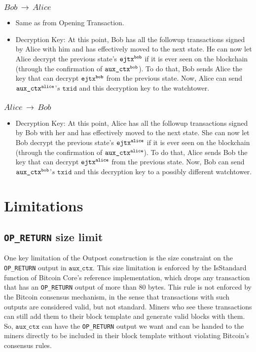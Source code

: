 \subsubsection{$Bob\,\to\,Alice$}
\begin{itemize}[leftmargin=4\parindent]
    \item Same as from Opening Transaction.
    \item Decryption Key: At this point, Bob has all the followup transactions signed by Alice with him and has effectively moved to the next state. He can now let Alice decrypt the previous state's $\texttt{ejtx\textsuperscript{bob}}$ if it is ever seen on the blockchain (through the confirmation of $\texttt{aux\_ctx\textsuperscript{bob}}$). To do that, Bob sends Alice the key that can decrypt $\texttt{ejtx\textsuperscript{bob}}$ from the previous state. Now, Alice can send $\texttt{aux\_ctx\textsuperscript{alice}}$'$s$ $\texttt{txid}$ and this decryption key to the watchtower.
\end{itemize}
\subsubsection{$Alice\,\to\,Bob$}        
\begin{itemize}[leftmargin=4\parindent]
    \item Decryption Key: At this point, Alice has all the followup transactions signed by Bob with her and has effectively moved to the next state. She can now let Bob decrypt the previous state's $\texttt{ejtx\textsuperscript{alice}}$ if it is ever seen on the blockchain (through the confirmation of $\texttt{aux\_ctx\textsuperscript{alice}}$). To do that, Alice sends Bob the key that can decrypt $\texttt{ejtx\textsuperscript{alice}}$ from the previous state. Now, Bob can send $\texttt{aux\_ctx\textsuperscript{bob}}$'$s$ $\texttt{txid}$ and this decryption key to a possibly different watchtower.
\end{itemize}

\section{Limitations}
\subsection{\texttt{OP\_RETURN} size limit}
One key limitation of the Outpost construction is the size constraint on the \texttt{OP\_RETURN} output in $\texttt{aux\_ctx}$. This size limitation is enforced by the IsStandard function of Bitcoin Core's reference implementation, which drops any transaction that has an \texttt{OP\_RETURN} output of more than 80 bytes. This rule is not enforced by the Bitcoin consensus mechanism, in the sense that transactions with such outputs are considered valid, but not standard. Miners who see these transactions can still add them to their block template and generate valid blocks with them. So, $\texttt{aux\_ctx}$ can have the \texttt{OP\_RETURN} output we want and can be handed to the miners directly to be included in their block template without violating Bitcoin's consensus rules. 

